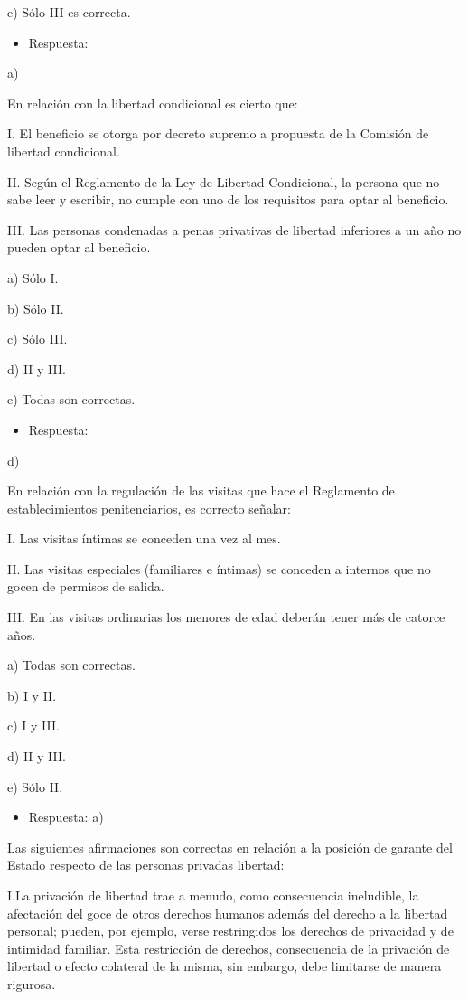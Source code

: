 \documentclass[letterpaper, 11pt]{article}
\begin{document}
e) Sólo III es correcta.

\begin{itemize}
\item Respuesta:
\end{itemize}
a)

En relación con la libertad condicional es cierto que:

I. El beneficio se otorga por decreto supremo a propuesta de la Comisión de libertad
condicional.

II. Según el Reglamento de la Ley de Libertad Condicional, la persona que no sabe leer
y escribir, no cumple con uno de los requisitos para optar al beneficio.

III. Las personas condenadas a penas privativas de libertad inferiores a un año no
pueden optar al beneficio.

a) Sólo I.

b) Sólo II.

c) Sólo III.

d) II y III.

e) Todas son correctas.

\begin{itemize}
\item Respuesta:
\end{itemize}
d)


En relación con la regulación de las visitas que hace el Reglamento de
establecimientos penitenciarios, es correcto señalar:

I. Las visitas íntimas se conceden una vez al mes.

II. Las visitas especiales (familiares e íntimas) se conceden a internos que no gocen de
permisos de salida.

III. En las visitas ordinarias los menores de edad deberán tener más de catorce años.

a) Todas son correctas.

b) I y II.

c) I y III.

d) II y III.

e) Sólo II.

\begin{itemize}
\item Respuesta:
a)
\end{itemize}



Las siguientes afirmaciones son correctas en relación a la posición de garante del
Estado respecto de las personas privadas libertad:

I.La privación de libertad trae a menudo, como consecuencia ineludible, la
afectación del goce de otros derechos humanos además del derecho a la libertad
personal; pueden, por ejemplo, verse restringidos los derechos de privacidad y de
intimidad familiar. Esta restricción de derechos, consecuencia de la privación de
libertad o efecto colateral de la misma, sin embargo, debe limitarse de manera
rigurosa.
\end{document}
